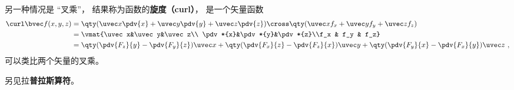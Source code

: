 另一种情况是 “叉乘”， 结果称为函数的\textbf{旋度（curl）}， 是一个矢量函数
\begin{equation}\label{eq_VecOp_3}
\begin{aligned}
\curl \bvec f(x, y, z) &= \qty(\uvec x \pdv{x} + \uvec y \pdv{y} + \uvec z \pdv{z}) \cross \qty(\uvec x f_x + \uvec y f_y + \uvec z f_z)\\
&= \vmat{\uvec x&\uvec y&\uvec z\\ \pdv*{x}&\pdv*{y}&\pdv*{z}\\f_x & f_y & f_z}\\
&= \qty(\pdv{F_z}{y} - \pdv{F_y}{z})\uvec x + \qty(\pdv{F_x}{z} - \pdv{F_z}{x})\uvec y + \qty(\pdv{F_y}{x} - \pdv{F_x}{y})\uvec z~,
\end{aligned}
\end{equation}
可以类比两个矢量的叉乘。

另见拉\textbf{普拉斯算符}。

